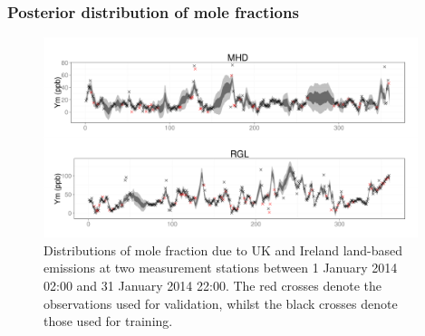 \documentclass{beamer}
\begin{document}
\begin{frame}
\frametitle{Posterior distribution of mole fractions}
\begin{center}
\vspace{-0.5cm}

\vspace{-0.1in}

\begin{figure}
\includegraphics[width=4.3in]{Figure8a.pdf}
	\caption{\footnotesize Distributions of mole fraction due to UK and Ireland land-based emissions at two measurement stations between 1 January 2014 02:00 and 31 January 2014 22:00. The red crosses denote the observations used for validation, whilst the black crosses denote those used for training.}
\end{figure}
\end{center}
\end{frame}
\end{document}
